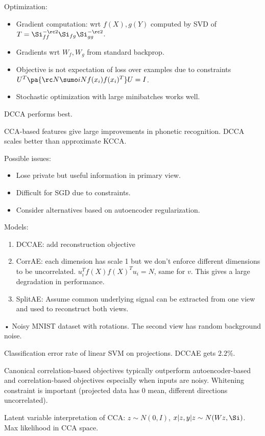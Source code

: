 Optimization:
\begin{itemize}
\item
Gradient computation: wrt $f(X),g(Y)$ computed by SVD of $T=\Si_{ff}^{-\rc 2} \Si_{fg}\Si_{gg}^{-\rc 2}$. 
\item
Gradients wrt $W_f,W_g$ from standard backprop.
\item
Objective is not expectation of loss over examples  due to constraints $U^T\pa{\rc N \sumo iN f(x_i)f(x_i)^T}U=I$.
\item
Stochastic optimization with large minibatches works well.
\end{itemize}

DCCA performs best.

CCA-based features give large improvements in phonetic recognition. 
DCCA scales better than approximate KCCA.

Possible issues:
\begin{itemize}
\item
Lose private but useful information in primary view.
\item
Difficult for SGD due to constraints.
\item
Consider alternatives based on autoencoder regularization.
\end{itemize}

Models:
\begin{enumerate}
\item
DCCAE: add reconstruction objective
\item
CorrAE: 
each dimension has scale 1 but we don't enforce different dimensions to be uncorrelated. $u_i^T f(X)f(X)^Tu_i = N$, same for $v$. This gives a large degradation in performance.
\item
SplitAE: 
Assume common underlying signal can be extracted from one view and used to reconstruct both views.
\end{enumerate}•
Noisy MNIST dataset with rotations. The second view has random background noise. %

Classification error rate of linear SVM on projections. DCCAE gets $2.2\%$.

Canonical correlation-based objectives typically outperform autoencoder-based and correlation-based objectives especially when inputs are noisy. Whitening constraint is important (projected data has 0 mean, different directions uncorrelated).

Latent variable interpretation of CCA: $z\sim N(0,I)$, $x|z,y|z\sim N(Wz,\Si)$. Max likelihood in CCA space.

